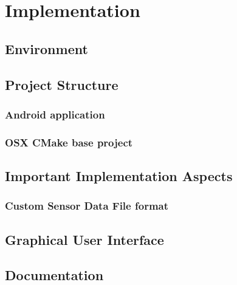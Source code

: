 
\chapter{Implementation} %



\section{Environment}
\section{Project Structure}
\subsection{Android application}
\subsection{OSX CMake base project}
\section{Important Implementation Aspects}
\subsection{Custom Sensor Data File format}
\section{Graphical User Interface}
\section{Documentation}






